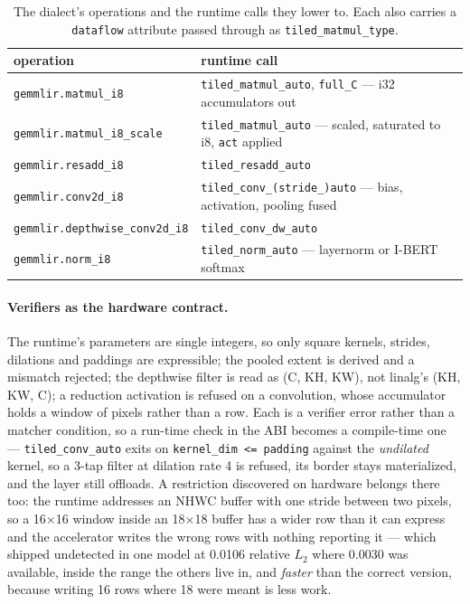 \documentclass[runningheads]{llncs}
\begin{document}
\begin{table}[t]
\caption{The dialect's operations and the runtime calls they lower to. Each also
carries a \texttt{dataflow} attribute passed through as
\texttt{tiled\_matmul\_type}.}\label{tab:ops}
\footnotesize
\begin{tabular}{|l|l|}
\hline
operation & runtime call \\
\hline
\texttt{gemmlir.matmul\_i8} & \texttt{tiled\_matmul\_auto}, \texttt{full\_C} --- i32 accumulators out \\
\texttt{gemmlir.matmul\_i8\_scale} & \texttt{tiled\_matmul\_auto} --- scaled, saturated to i8, \texttt{act} applied \\
\texttt{gemmlir.resadd\_i8} & \texttt{tiled\_resadd\_auto} \\
\texttt{gemmlir.conv2d\_i8} & \texttt{tiled\_conv\_(stride\_)auto} --- bias, activation, pooling fused \\
\texttt{gemmlir.depthwise\_conv2d\_i8} & \texttt{tiled\_conv\_dw\_auto} \\
\texttt{gemmlir.norm\_i8} & \texttt{tiled\_norm\_auto} --- layernorm or I-BERT softmax \\
\hline
\end{tabular}
\end{table}

\paragraph{Verifiers as the hardware contract.} The runtime's parameters are
single integers, so only square kernels, strides, dilations and paddings are
expressible; the pooled extent is derived and a mismatch rejected; the depthwise
filter is read as (C, KH, KW), not linalg's (KH, KW, C); a reduction activation is
refused on a convolution, whose accumulator holds a window of pixels rather than a
row. Each is a verifier error rather than a matcher condition, so a run-time check
in the ABI becomes a compile-time one --- \texttt{tiled\_conv\_auto} exits on
\texttt{kernel\_dim <= padding} against the \emph{undilated} kernel, so a 3-tap
filter at dilation rate 4 is refused, its border stays materialized, and the layer
still offloads. A restriction discovered on hardware belongs there too: the runtime
addresses an NHWC buffer with one stride between two pixels, so a 16$\times$16
window inside an 18$\times$18 buffer has a wider row than it can express and the
accelerator writes the wrong rows with nothing reporting it --- which shipped
undetected in one model at 0.0106 relative $L_2$ where 0.0030 was available, inside
the range the others live in, and \emph{faster} than the correct version, because
writing 16 rows where 18 were meant is less work.
\end{document}
